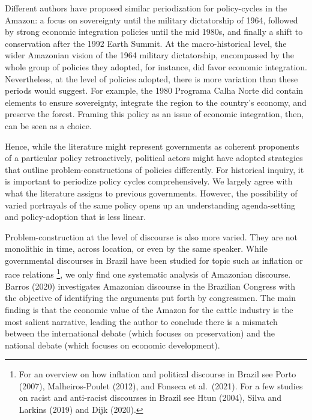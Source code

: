 \documentclass[
]{article}
\begin{document}
Different authors have proposed similar periodization for policy-cycles
in the Amazon: a focus on sovereignty until the military dictatorship of
1964, followed by strong economic integration policies until the mid
1980s, and finally a shift to conservation after the 1992 Earth Summit.
At the macro-historical level, the wider Amazonian vision of the 1964
military dictatorship, encompassed by the whole group of policies they
adopted, for instance, did favor economic integration. Nevertheless, at
the level of policies adopted, there is more variation than these
periods would suggest. For example, the 1980 Programa Calha Norte did
contain elements to ensure sovereignty, integrate the region to the
country's economy, and preserve the forest. Framing this policy as an
issue of economic integration, then, can be seen as a choice.

Hence, while the literature might represent governments as coherent
proponents of a particular policy retroactively, political actors might
have adopted strategies that outline problem-constructions of policies
differently. For historical inquiry, it is important to periodize policy
cycles comprehensively. We largely agree with what the literature
assigns to previous governments. However, the possibility of varied
portrayals of the same policy opens up an understanding agenda-setting
and policy-adoption that is less linear.

Problem-construction at the level of discourse is also more varied. They
are not monolithic in time, across location, or even by the same
speaker. While governmental discourses in Brazil have been studied for
topic such as inflation or race relations \footnote{For an overview on
  how inflation and political discourse in Brazil see Porto (2007),
  Malheiros-Poulet (2012), and Fonseca et al.~(2021). For a few studies
  on racist and anti-racist discourses in Brazil see Htun (2004), Silva
  and Larkins (2019) and Dijk (2020).}, we only find one systematic
analysis of Amazonian discourse. Barros (2020) investigates Amazonian
discourse in the Brazilian Congress with the objective of identifying
the arguments put forth by congressmen. The main finding is that the
economic value of the Amazon for the cattle industry is the most salient
narrative, leading the author to conclude there is a mismatch between
the international debate (which focuses on preservation) and the
national debate (which focuses on economic development).
\end{document}
